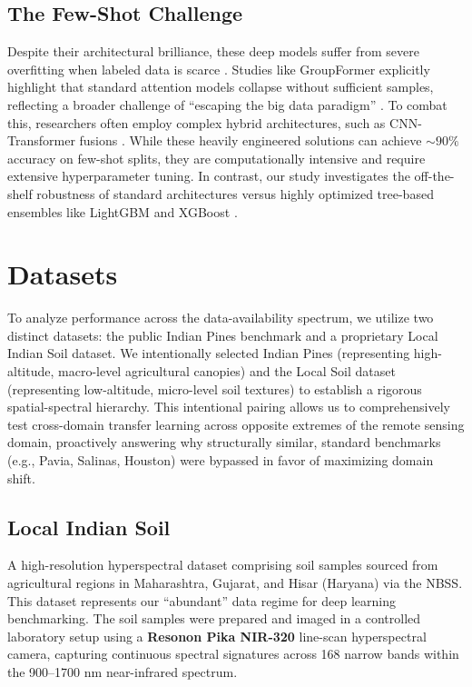 \documentclass[pdflatex,sn-mathphys-num,iicol]{sn-jnl}
\begin{document}
\subsection{The Few-Shot Challenge}
Despite their architectural brilliance, these deep models suffer from severe overfitting when labeled data is scarce \cite{b23, b31}. Studies like GroupFormer \cite{b5} explicitly highlight that standard attention models collapse without sufficient samples, reflecting a broader challenge of ``escaping the big data paradigm'' \cite{b24}. To combat this, researchers often employ complex hybrid architectures, such as CNN-Transformer fusions \cite{b7}. While these heavily engineered solutions can achieve $\sim 90\%$ accuracy on few-shot splits, they are computationally intensive and require extensive hyperparameter tuning. In contrast, our study investigates the off-the-shelf robustness of standard architectures versus highly optimized tree-based ensembles like LightGBM \cite{b27} and XGBoost \cite{b26, b17}.

\section{Datasets}\label{sec:datasets}
To analyze performance across the data-availability spectrum, we utilize two distinct datasets: the public Indian Pines benchmark and a proprietary Local Indian Soil dataset. We intentionally selected Indian Pines (representing high-altitude, macro-level agricultural canopies) and the Local Soil dataset (representing low-altitude, micro-level soil textures) to establish a rigorous spatial-spectral hierarchy. This intentional pairing allows us to comprehensively test cross-domain transfer learning across opposite extremes of the remote sensing domain, proactively answering why structurally similar, standard benchmarks (e.g., Pavia, Salinas, Houston) were bypassed in favor of maximizing domain shift.

\subsection{Local Indian Soil}
A high-resolution hyperspectral dataset comprising soil samples sourced from agricultural regions in Maharashtra, Gujarat, and Hisar (Haryana) via the NBSS. This dataset represents our ``abundant'' data regime for deep learning benchmarking. The soil samples were prepared and imaged in a controlled laboratory setup using a \textbf{Resonon Pika NIR-320} line-scan hyperspectral camera, capturing continuous spectral signatures across 168 narrow bands within the 900–1700 nm near-infrared spectrum. 
\end{document}
